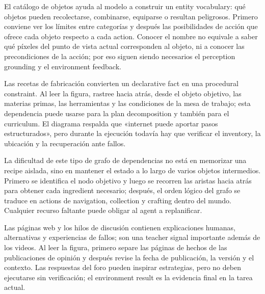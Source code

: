 El catálogo de objetos ayuda al modelo a construir un entity vocabulary: qué objetos pueden recolectarse, combinarse, equiparse o resultan peligrosos. Primero conviene ver los límites entre categorías y después las posibilidades de acción que ofrece cada objeto respecto a cada action. Conocer el nombre no equivale a saber qué píxeles del punto de vista actual corresponden al objeto, ni a conocer las precondiciones de la acción; por eso siguen siendo necesarios el perception grounding y el environment feedback.


Las recetas de fabricación convierten un declarative fact en una procedural constraint. Al leer la figura, rastree hacia atrás, desde el objeto objetivo, las materias primas, las herramientas y las condiciones de la mesa de trabajo; esta dependencia puede usarse para la plan decomposition y también para el curriculum. El diagrama respalda que «internet puede aportar pasos estructurados», pero durante la ejecución todavía hay que verificar el inventory, la ubicación y la recuperación ante fallos.


La dificultad de este tipo de grafo de dependencias no está en memorizar una recipe aislada, sino en mantener el estado a lo largo de varios objetos intermedios. Primero se identifica el nodo objetivo y luego se recorren las aristas hacia atrás para obtener cada ingredient necesario; después, el orden lógico del grafo se traduce en actions de navigation, collection y crafting dentro del mundo. Cualquier recurso faltante puede obligar al agent a replanificar.


Las páginas web y los hilos de discusión contienen explicaciones humanas, alternativas y experiencias de fallos; son una teacher signal importante además de los videos. Al leer la figura, primero separe las páginas de hechos de las publicaciones de opinión y después revise la fecha de publicación, la versión y el contexto. Las respuestas del foro pueden inspirar estrategias, pero no deben ejecutarse sin verificación; el environment result es la evidencia final en la tarea actual.

